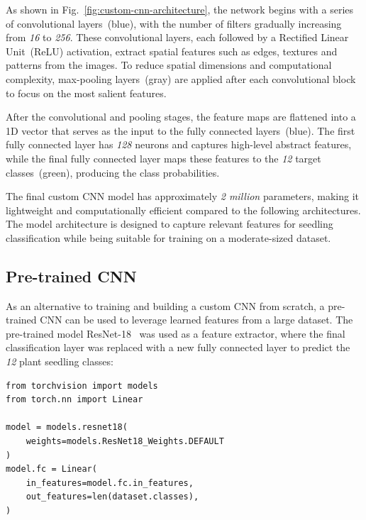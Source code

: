 As shown in Fig.~\ref{fig:custom-cnn-architecture}, the network begins with a series of convolutional layers~(blue), with the number of filters gradually increasing from \textit{16} to \textit{256}. These convolutional layers, each followed by a Rectified Linear Unit~(ReLU) activation, extract spatial features such as edges, textures and patterns from the images. To reduce spatial dimensions and computational complexity, max-pooling layers~(gray) are applied after each convolutional block to focus on the most salient features.

After the convolutional and pooling stages, the feature maps are flattened into a 1D vector that serves as the input to the fully connected layers~(blue). The first fully connected layer has \textit{128} neurons and captures high-level abstract features, while the final fully connected layer maps these features to the \textit{12} target classes~(green), producing the class probabilities.

The final custom CNN model has approximately \textit{2 million} parameters, making it lightweight and computationally efficient compared to the following architectures. The model architecture is designed to capture relevant features for seedling classification while being suitable for training on a moderate-sized dataset.

\subsection{Pre-trained CNN}

As an alternative to training and building a custom CNN from scratch, a pre-trained CNN can be used to leverage learned features from a large dataset. The pre-trained model ResNet-18~\cite{DBLP:journals/corr/HeZRS15} was used as a feature extractor, where the final classification layer was replaced with a new fully connected layer to predict the \textit{12} plant seedling classes:

\begin{minipage}{0.9\linewidth}\begin{lstlisting}[caption={Replacing the final classification layer of a pre-trained ResNet-18 model.},label={lst:pre-trained-cnn}]
from torchvision import models
from torch.nn import Linear

model = models.resnet18(
    weights=models.ResNet18_Weights.DEFAULT
)
model.fc = Linear(
    in_features=model.fc.in_features,
    out_features=len(dataset.classes),
)
\end{lstlisting}\end{minipage}

